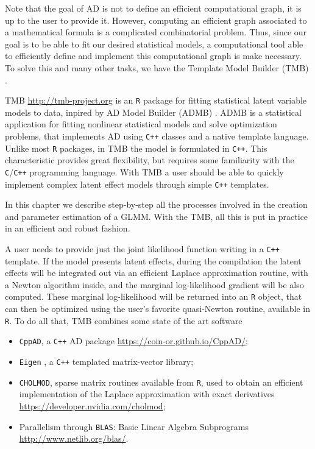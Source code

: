 Note that the goal of AD is not to define an efficient computational
graph, it is up to the user to provide it. However, computing an
efficient graph associated to a mathematical formula is a complicated
combinatorial problem. Thus, since our goal is to be able to fit our
desired statistical models, a computational tool able to efficiently
define and implement this computational graph is make necessary. To
solve this and many other tasks, we have the Template Model Builder
(TMB) \cite{TMB}.

TMB \url{ http://tmb-project.org} is an \texttt{R} \cite{R18} package
for fitting statistical latent variable models to data, inpired by AD
Model Builder (ADMB) \cite{ADMB}. ADMB is a statistical application for
fitting nonlinear statistical models and solve optimization problems,
that implements AD using \texttt{C++} classes and a native template
language. Unlike most \texttt{R} packages, in TMB the model is
formulated in \texttt{C++}. This characteristic provides great
flexibility, but requires some familiarity with the
\texttt{C}/\texttt{C++} programming language. With TMB a user should be
able to quickly implement complex latent effect models through simple
\texttt{C++} templates.

In this chapter we describe step-by-step all the processes involved in
the creation and parameter estimation of a GLMM. With the TMB, all this
is put in practice in an efficient and robust fashion.

A user needs to provide just the joint likelihood function writing in a
\texttt{C++} template. If the model presents latent effects, during the
compilation the latent effects will be integrated out via an efficient
Laplace approximation routine, with a Newton algorithm inside, and the
marginal log-likelihood gradient will be also computed. These marginal
log-likelihood will be returned into an \texttt{R} object, that can then
be optimized using the user's favorite quasi-Newton routine, available
in \texttt{R}. To do all that, TMB combines some state of the art
software

\begin{itemize}
\item \texttt{CppAD}, a \texttt{C++} AD package
  \url{https://coin-or.github.io/CppAD/};
\item \texttt{Eigen} \cite{eigen}, a \texttt{C++} templated
  matrix-vector library;
\item \texttt{CHOLMOD}, sparse matrix routines available from
  \texttt{R}, used to obtain an efficient implementation of the Laplace
  approximation with exact derivatives
  \url{https://developer.nvidia.com/cholmod};
\item Parallelism through \texttt{BLAS}: Basic Linear Algebra
  Subprograms \url{http://www.netlib.org/blas/}.
\end{itemize}

